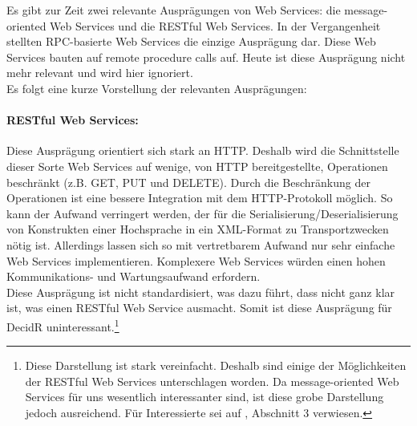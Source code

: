 \documentclass[runningheads]{llncs}
\newcommand{\germanquote}[1]{\glqq{}#1\grqq{}}
\newcommand{\decidr}{DecidR}
\begin{document}
    Es gibt zur Zeit zwei relevante Ausprägungen von Web Services: die
    \germanquote{message-oriented Web Services} und die \germanquote{RESTful Web Services}. In der
    Vergangenheit stellten RPC-basierte Web Services die einzige Ausprägung dar. Diese Web Services
    bauten auf \germanquote{remote procedure calls} auf. Heute ist diese Ausprägung nicht mehr
    relevant und wird hier ignoriert.\\
    Es folgt eine kurze Vorstellung der relevanten Ausprägungen:

    \paragraph{RESTful Web Services:}
      Diese Ausprägung orientiert sich stark an HTTP. Deshalb wird die Schnittstelle dieser Sorte
      Web Services auf wenige, von HTTP bereitgestellte, Operationen beschränkt (z.B. GET, PUT und
      DELETE). Durch die Beschränkung der Operationen ist eine bessere Integration mit dem
      HTTP-Protokoll möglich. So kann der Aufwand verringert werden, der für die
      Serialisierung/Deserialisierung von Konstrukten einer Hochsprache in ein XML-Format zu
      Transportzwecken nötig ist. Allerdings lassen sich so mit vertretbarem Aufwand nur sehr
      einfache Web Services implementieren. Komplexere Web Services würden einen hohen
      Kommunikations- und Wartungsaufwand erfordern.\\
      Diese Ausprägung ist nicht standardisiert, was dazu führt, dass nicht ganz klar ist, was
      einen RESTful Web Service ausmacht. Somit ist diese Ausprägung für \decidr{}
      uninteressant.\footnote{Diese Darstellung ist stark vereinfacht. Deshalb sind einige der
      Möglichkeiten der RESTful Web Services unterschlagen worden. Da message-oriented Web Services
      für uns wesentlich interessanter sind, ist diese grobe Darstellung jedoch ausreichend. Für
      Interessierte sei auf \cite{paper_pautasso}, Abschnitt 3 verwiesen.}
\end{document}
